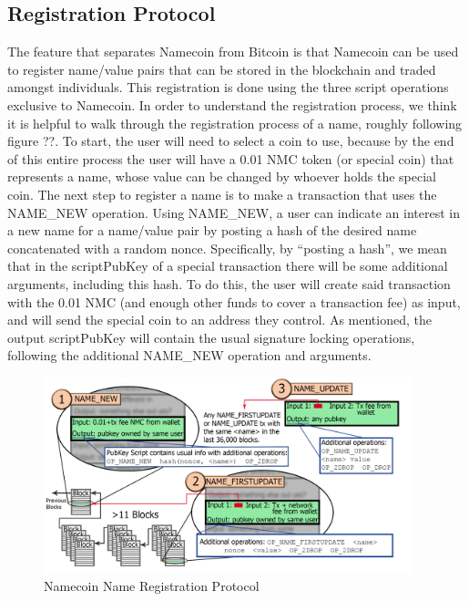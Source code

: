 \subsection{Registration Protocol}
The feature that separates Namecoin from Bitcoin is that Namecoin can be used to register name/value pairs that can be stored in the blockchain and traded amongst individuals. This registration is done using the three script operations exclusive to Namecoin. In order to understand the registration process, we think it is helpful to walk through the registration process of a name, roughly following figure ??. To start, the user will need to select a coin to use, because by the end of this entire process the user will have a 0.01 NMC token (or special coin) that represents a name, whose value can be changed by whoever holds the special coin. The next step to register a name is to make a transaction that uses the NAME\_NEW  operation. Using NAME\_NEW, a user can indicate an interest in a new name for a name/value pair by posting a hash of the desired name concatenated with a random nonce. Specifically, by ``posting a hash'', we mean that in the scriptPubKey of a special transaction there will be some additional arguments, including this hash. To do this, the user will create said transaction with the 0.01 NMC (and enough other funds to cover a transaction fee) as input, and will send the special coin to an address they control. As mentioned, the output scriptPubKey will contain the usual signature locking operations, following the additional NAME\_NEW operation and arguments.

\begin{figure}
  \centering
  \includegraphics[width=0.95\textwidth]{registration.png}
  \caption{Namecoin Name Registration Protocol}
  \label{fig:registration}
\end{figure}

